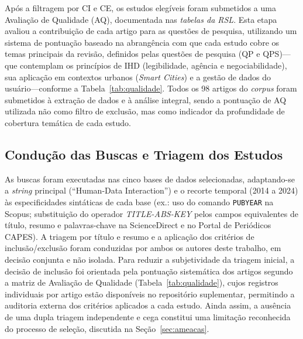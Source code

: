 \documentclass[12pt]{article}
\begin{document}
Após a filtragem por CI e CE, os estudos elegíveis foram submetidos a uma Avaliação de Qualidade (AQ), documentada nas \emph{tabelas da RSL}\footnotemark[\footTabelas]. Esta etapa avaliou a contribuição de cada artigo para as questões de pesquisa, utilizando um sistema de pontuação baseado na abrangência com que cada estudo cobre os temas principais da revisão, definidos pelas questões de pesquisa (QP e QPS)---que contemplam os princípios de IHD (legibilidade, agência e negociabilidade), sua aplicação em contextos urbanos (\textit{Smart Cities}) e a gestão de dados do usuário---conforme a Tabela~\ref{tab:qualidade}. Todos os 98 artigos do \textit{corpus} foram submetidos à extração de dados e à análise integral, sendo a pontuação de AQ utilizada não como filtro de exclusão, mas como indicador da profundidade de cobertura temática de cada estudo.

\begin{table}[H]
\centering
\caption{Sistema de Pontuação para Avaliação de Qualidade (AQ)}
\label{tab:qualidade}
\small
{}
\end{table}

\raggedbottom
\subsection{Condução das Buscas e Triagem dos Estudos}

As buscas foram executadas nas cinco bases de dados selecionadas, adaptando-se a \textit{string} principal (``Human-Data Interaction'') e o recorte temporal (2014 a 2024) às especificidades sintáticas de cada base (ex.: uso do comando \texttt{PUBYEAR} na Scopus; substituição do operador \textit{TITLE-ABS-KEY} pelos campos equivalentes de título, resumo e palavras-chave na ScienceDirect e no Portal de Periódicos CAPES). A triagem por título e resumo e a aplicação dos critérios de inclusão/exclusão foram conduzidas por ambos os autores deste trabalho, em decisão conjunta e não isolada. Para reduzir a subjetividade da triagem inicial, a decisão de inclusão foi orientada pela pontuação sistemática dos artigos segundo a matriz de Avaliação de Qualidade (Tabela~\ref{tab:qualidade}), cujos registros individuais por artigo estão disponíveis no repositório suplementar\footnotemark[\footTabelas], permitindo a auditoria externa dos critérios aplicados a cada estudo. Ainda assim, a ausência de uma dupla triagem independente e cega constitui uma limitação reconhecida do processo de seleção, discutida na Seção~\ref{sec:ameacas}.
\end{document}
